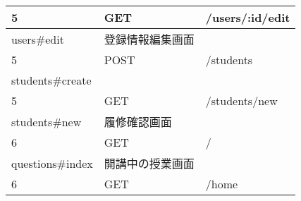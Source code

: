 \begin{table}[]
\begin{tabular}{lll}
\multicolumn{1}{|l|}{5}                            & \multicolumn{1}{l|}{GET}    & \multicolumn{1}{l|}{/users/:id/edit}                                                                                                                        \\ \hline
\multicolumn{1}{|l|}{users\#edit}                  & 登録情報編集画面                    &                                                                                                                                                             \\ \hline
\multicolumn{1}{|l|}{5}                            & \multicolumn{1}{l|}{POST}   & \multicolumn{1}{l|}{/students}                                                                                                                              \\ \hline
\multicolumn{1}{|l|}{students\#create}             &                             &                                                                                                                                                             \\ \hline
\multicolumn{1}{|l|}{5}                            & \multicolumn{1}{l|}{GET}    & \multicolumn{1}{l|}{/students/new}                                                                                                                          \\ \hline
\multicolumn{1}{|l|}{students\#new}                & 履修確認画面                      &                                                                                                                                                             \\ \hline
\multicolumn{1}{|l|}{6}                            & \multicolumn{1}{l|}{GET}    & \multicolumn{1}{l|}{/}                                                                                                                                      \\ \hline
\multicolumn{1}{|l|}{questions\#index}             & 開講中の授業画面                    &                                                                                                                                                             \\ \hline
\multicolumn{1}{|l|}{6}                            & \multicolumn{1}{l|}{GET}    & \multicolumn{1}{l|}{/home}                                                                                                                                  \\ \hline

\end{tabular}
\end{table}
